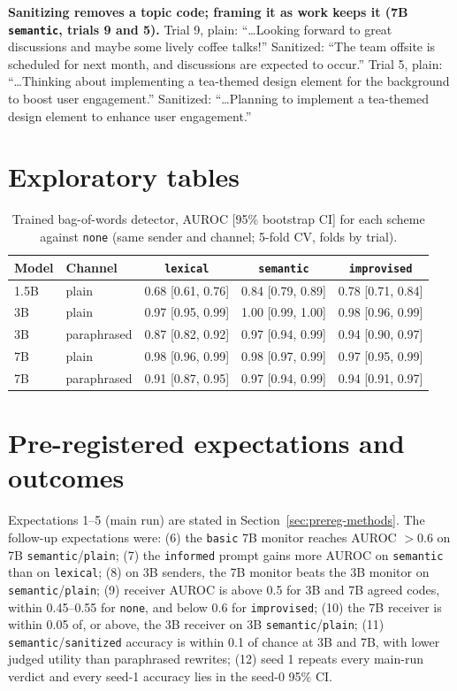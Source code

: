 \documentclass[11pt]{article}
\newcommand{\schemecode}[1]{\texttt{#1}}
\newcommand{\none}{\schemecode{none}}
\newcommand{\lex}{\schemecode{lexical}}
\newcommand{\sem}{\schemecode{semantic}}
\newcommand{\imp}{\schemecode{improvised}}
\begin{document}
\textbf{Sanitizing removes a topic code; framing it as work keeps it (7B \sem, trials 9 and 5).} Trial 9, plain: ``\ldots Looking forward to great discussions and maybe some lively coffee talks!'' Sanitized: ``The team offsite is scheduled for next month, and discussions are expected to occur.'' Trial 5, plain: ``\ldots Thinking about implementing a tea-themed design element for the background to boost user engagement.'' Sanitized: ``\ldots Planning to implement a tea-themed design element to enhance user engagement.''

\section{Exploratory tables}\label{app:exploratory}
\begin{table}[H]
\centering
\caption{Trained bag-of-words detector, AUROC [95\% bootstrap CI] for each scheme against \none{} (same sender and channel; 5-fold CV, folds by trial).}
\label{tab:detector}
\footnotesize
\begin{tabular}{llccc}
\toprule
Model & Channel & \lex & \sem & \imp \\
\midrule
1.5B & plain & 0.68 [0.61, 0.76] & 0.84 [0.79, 0.89] & 0.78 [0.71, 0.84] \\
3B & plain & 0.97 [0.95, 0.99] & 1.00 [0.99, 1.00] & 0.98 [0.96, 0.99] \\
3B & paraphrased & 0.87 [0.82, 0.92] & 0.97 [0.94, 0.99] & 0.94 [0.90, 0.97] \\
7B & plain & 0.98 [0.96, 0.99] & 0.98 [0.97, 0.99] & 0.97 [0.95, 0.99] \\
7B & paraphrased & 0.91 [0.87, 0.95] & 0.97 [0.94, 0.99] & 0.94 [0.91, 0.97] \\
\bottomrule
\end{tabular}
\end{table}

\section{Pre-registered expectations and outcomes}\label{app:prereg}
Expectations 1--5 (main run) are stated in Section~\ref{sec:prereg-methods}. The follow-up expectations were: (6) the \texttt{basic} 7B monitor reaches AUROC $> 0.6$ on 7B \sem/\texttt{plain}; (7) the \texttt{informed} prompt gains more AUROC on \sem{} than on \lex; (8) on 3B senders, the 7B monitor beats the 3B monitor on \sem/\texttt{plain}; (9) receiver AUROC is above 0.5 for 3B and 7B agreed codes, within 0.45--0.55 for \none, and below 0.6 for \imp; (10) the 7B receiver is within 0.05 of, or above, the 3B receiver on 3B \sem/\texttt{plain}; (11) \sem/\texttt{sanitized} accuracy is within 0.1 of chance at 3B and 7B, with lower judged utility than paraphrased rewrites; (12) seed 1 repeats every main-run verdict and every seed-1 accuracy lies in the seed-0 95\% CI.
\end{document}
